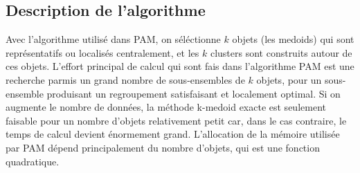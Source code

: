\documentclass[11pt]{article}
\begin{document}
\subsection{Description de l'algorithme}
Avec l'algorithme utilisé dans PAM, on séléctionne $k$ objets (les medoids) qui sont représentatifs ou localisés centralement, et les $k$ clusters sont construits autour de ces objets. L'effort principal de calcul qui sont fais dans l'algorithme  PAM est une recherche parmis un grand nombre de sous-ensembles de $k$ objets, pour un sous-ensemble produisant un regroupement satisfaisant et localement optimal. Si on augmente le nombre de données, la méthode k-medoid exacte est seulement faisable pour un nombre d'objets relativement petit car, dans le cas contraire, le temps de calcul devient énormement grand. L'allocation de la mémoire utilisée par PAM dépend principalement du nombre d'objets, qui est une fonction quadratique.\\
\end{document}
